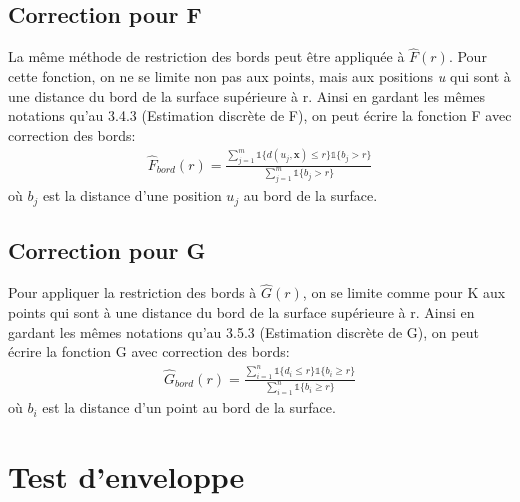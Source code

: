 \documentclass[stage2a]{tnreport}
\begin{document}

\subsection{Correction pour F}

La même méthode de restriction des bords peut être appliquée à \begin{math} \hat{F}(r) \end{math}. Pour cette fonction, on ne se limite non pas aux points, mais aux positions \textit{u} qui sont à une distance du bord de la surface supérieure à r. Ainsi en gardant les mêmes notations qu'au 3.4.3 (Estimation discrète de F), on peut écrire la fonction F avec correction des bords:
\begin{align*}
\hat{F}_{bord}(r) = \frac{  \sum_{j=1}^m \mathds{1} \{d(u_j,\textbf{x}) \leq r \} \mathds{1} \{b_j > r \} }{ \sum_{j=1}^m \mathds{1} \{b_j > r \}}
\end{align*}
où \begin{math}b_j\end{math} est la distance d'une position \begin{math}u_j\end{math} au bord de la surface.


\subsection{Correction pour G}

Pour appliquer la restriction des bords à \begin{math} \hat{G}(r) \end{math}, on se limite comme pour K aux points qui sont à une distance du bord de la surface supérieure à r. Ainsi en gardant les mêmes notations qu'au 3.5.3 (Estimation discrète de G), on peut écrire la fonction G avec correction des bords:
\begin{align*}
\hat{G}_{bord}(r) = \frac{  \sum_{i=1}^n \mathds{1} \{d_i \leq r \} \mathds{1} \{b_i \geq r \} }{ \sum_{i=1}^n \mathds{1} \{b_i \geq r \}}
\end{align*}
où \begin{math}b_i\end{math} est la distance d'un point au bord de la surface.


\section{Test d'enveloppe}
\end{document}
